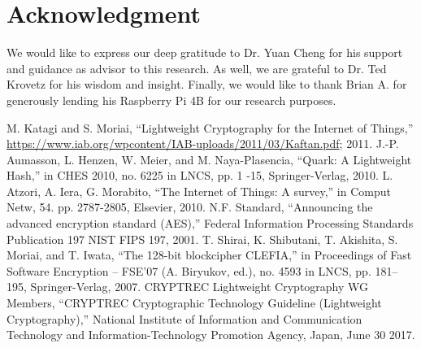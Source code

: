 \documentclass[conference]{IEEEtran}
\begin{document}
\section*{Acknowledgment}
We would like to express our deep gratitude to Dr. Yuan Cheng for his support and guidance as advisor to this research. As well, we are grateful to Dr. Ted Krovetz for his wisdom and insight. Finally, we would like to thank Brian A. for generously lending his Raspberry Pi 4B for our research purposes.

\begin{thebibliography}{00}
	 M. Katagi and S. Moriai, ``Lightweight Cryptography for the Internet of Things,'' \url{https://www.iab.org/wpcontent/IAB-uploads/2011/03/Kaftan.pdf}; 2011.
	 J.-P. Aumasson, L. Henzen, W. Meier, and M. Naya-Plasencia, ``Quark: A Lightweight Hash,'' in CHES 2010, no. 6225 in LNCS, pp. 1 -15, Springer-Verlag, 2010.
	 L. Atzori, A. Iera, G. Morabito, ``The Internet of Things: A survey,'' in Comput Netw, 54. pp. 2787-2805, Elsevier, 2010.
	 N.F. Standard, ``Announcing the advanced encryption standard (AES),'' Federal Information Processing Standards Publication 197 NIST FIPS 197, 2001.
	 T. Shirai, K. Shibutani, T. Akishita, S. Moriai, and T. Iwata, ``The 128-bit blockcipher CLEFIA,'' in Proceedings of Fast Software Encryption – FSE’07 (A. Biryukov, ed.), no. 4593 in LNCS, pp. 181–195, Springer-Verlag, 2007.
	 CRYPTREC Lightweight Cryptography WG Members, ``CRYPTREC Cryptographic Technology Guideline (Lightweight Cryptography),'' National Institute of Information and Communication Technology and Information-Technology Promotion Agency, Japan, June 30 2017.

\end{thebibliography}
\end{document}
